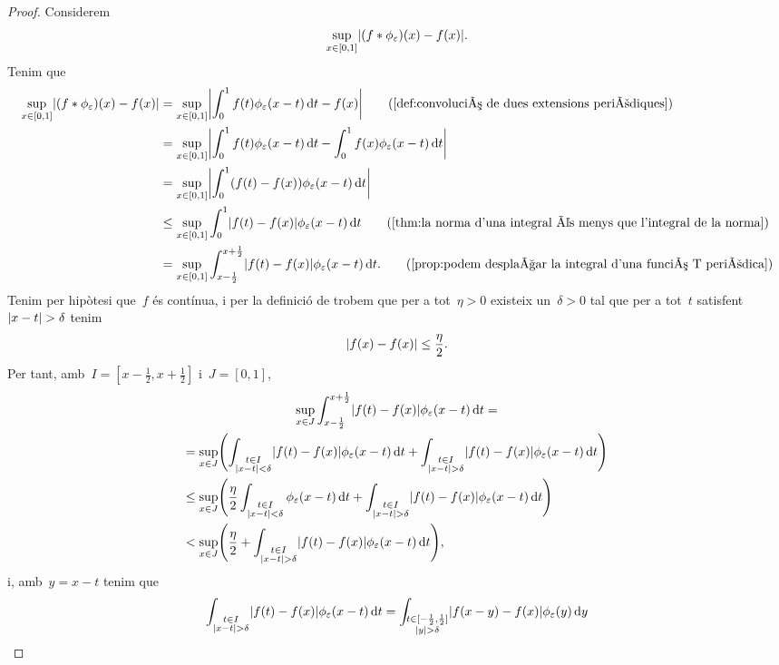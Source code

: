 \documentclass[../../main.tex]{subfiles}
\begin{document}
\begin{theorem}
\begin{proof}
			Considerem
			\[
			    \sup_{x\in[0,1]}\abs{(f\convolucio\phi_{\varepsilon})(x)-f(x)}.
			\]
			Tenim que
			\begin{align*}
				\sup_{x\in[0,1]}\abs{(f\convolucio\phi_{\varepsilon})(x)-f(x)}&=\sup_{x\in[0,1]}\abs{\int_{0}^{1}f(t)\phi_{\varepsilon}(x-t)\diff t-f(x)} \tag{\ref{def:convolució de dues extensions periòdiques}} \\
				&=\sup_{x\in[0,1]}\abs{\int_{0}^{1}f(t)\phi_{\varepsilon}(x-t)\diff t-\int_{0}^{1}f(x)\phi_{\varepsilon}(x-t)\diff t} \\
				&=\sup_{x\in[0,1]}\abs{\int_{0}^{1}(f(t)-f(x))\phi_{\varepsilon}(x-t)\diff t} \\
				&\leq\sup_{x\in[0,1]}\int_{0}^{1}\abs{f(t)-f(x)}\phi_{\varepsilon}(x-t)\diff t \tag{\ref{thm:la norma d'una integral és menys que l'integral de la norma}} \\
				&=\sup_{x\in[0,1]}\int_{x-\frac{1}{2}}^{x+\frac{1}{2}}\abs{f(t)-f(x)}\phi_{\varepsilon}(x-t)\diff t.
				\tag{\ref{prop:podem desplaçar la integral d'una funció T periòdica}}
			\end{align*}
			 Tenim per hipòtesi que~\(f\) és contínua, i per la definició de  trobem que per a tot~\(\eta>0\) existeix un~\(\delta>0\) tal que per a tot~\(t\) satisfent~\(\abs{x-t}>\delta\) tenim
			 \[
			     \abs{f(x)-f(x)}\leq\frac{\eta}{2}.
			 \]
			 Per tant, amb~\(I=[x-\frac{1}{2},x+\frac{1}{2}]\) i~\(J=[0,1]\), %
			 \begin{multline*}
				 \sup_{x\in J}\int_{x-\frac{1}{2}}^{x+\frac{1}{2}}\abs{f(t)-f(x)}\phi_{\varepsilon}(x-t)\diff t = \\
				 =\sup_{x\in J}\left(\int_{\substack{t\in I\\\abs{x-t}<\delta}}\abs{f(t)-f(x)}\phi_{\varepsilon}(x-t)\diff t+\int_{\substack{t\in I\\\abs{x-t}>\delta}}\abs{f(t)-f(x)}\phi_{\varepsilon}(x-t)\diff t\right) \hfill\\
				 \leq\sup_{x\in J}\left(\frac{\eta}{2}\int_{\substack{t\in I\\\abs{x-t}<\delta}}\phi_{\varepsilon}(x-t)\diff t+\int_{\substack{t\in I\\\abs{x-t}>\delta}}\abs{f(t)-f(x)}\phi_{\varepsilon}(x-t)\diff t\right) \hfill\\
				 <\sup_{x\in J}\left(\frac{\eta}{2}+\int_{\substack{t\in I\\\abs{x-t}>\delta}}\abs{f(t)-f(x)}\phi_{\varepsilon}(x-t)\diff t\right), \hfill
			 \end{multline*}
			 i, amb~\(y=x-t\) tenim que %
			 \[
			     \int_{\substack{t\in I\\\abs{x-t}>\delta}}\abs{f(t)-f(x)}\phi_{\varepsilon}(x-t)\diff t=\int_{\substack{t\in[-\frac{1}{2},\frac{1}{2}]\\\abs{y}>\delta}}\abs{f(x-y)-f(x)}\phi_{\varepsilon}(y)\diff y
			 \]
		\end{proof}
	\end{theorem}
\end{document}
